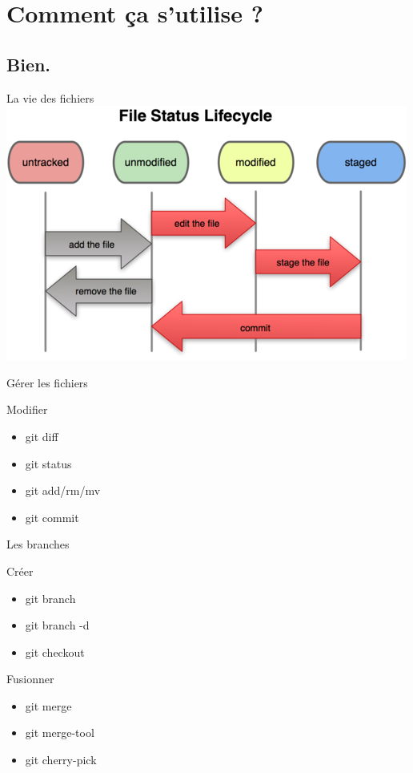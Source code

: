 \documentclass[xcolor=svgnames,12pt]{beamer}
\begin{document}
\section{Comment ça s'utilise ?}
\subsection{Bien.}
\begin{frame}{La vie des fichiers}
    \includegraphics[width=.7\paperwidth]{file.png}
\end{frame}

\begin{frame}{Gérer les fichiers}
    \begin{block}{Modifier}
        \begin{itemize}
            \item git diff
            \item git status
            \item git add/rm/mv
            \item git commit
        \end{itemize}
    \end{block}
\end{frame}

\begin{frame}{Les branches}
    \begin{block}{Créer}
        \begin{itemize}
            \item git branch
            \item git branch -d
            \item git checkout
        \end{itemize}
    \end{block}
    \pause
    \begin{block}{Fusionner}
        \begin{itemize}
            \item git merge
            \item git merge-tool
            \item git cherry-pick
        \end{itemize}
    \end{block}
\end{frame}
\end{document}
